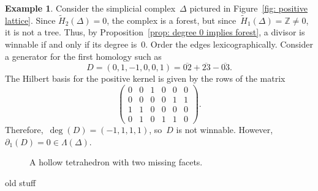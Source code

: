 \documentclass[12pt]{article}
\newcommand{\Z}{\mathbb{Z}}
\newcommand{\tH}{\widetilde{H}}
\theoremstyle{definition}
\newtheorem{example}[theorem]{Example}
\theoremstyle{remark}
\begin{document}
\begin{example}
  Consider the simplicial complex~$\Delta$ pictured in Figure~\ref{fig: positive
  lattice}. Since $\tH_2(\Delta)=0$, the complex is a forest, but
  since~$\tH_{1}(\Delta)=\Z\neq0$, it is not a tree.  
  Thus, by Proposition~\ref{prop: degree 0 implies forest}, a divisor is
  winnable if and only if its degree is~$0$.  Order the edges lexicographically.
  Consider a generator for the first
  homology such as 
  \[
    D=(0,1,-1,0,0,1)=\overline{02}+\overline{23}-\overline{03}.
  \]
  The Hilbert basis for the positive kernel is given by the rows of the matrix
  \[
  \left(\begin{array}{rrrrrr}
      0 & 0 & 1 & 0 & 0 & 0 \\
      0 & 0 & 0 & 0 & 1 & 1 \\
      1 & 1 & 0 & 0 & 0 & 0 \\
      0 & 1 & 0 & 1 & 1 & 0
  \end{array}\right).
  \]
  Therefore,~$\deg(D)=(-1,1,1,1)$, so~$D$ is not winnable.
  However,~$\partial_1(D)=0\in\Lambda(\Delta)$.
\end{example}

\begin{figure}[ht] 
  \centering
\caption{A hollow tetrahedron with two missing facets.}\label{fig: positive
lattice} 
\end{figure}

\bigskip
\centerline{\sc old stuff}
\medskip
\end{document}
